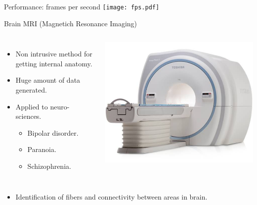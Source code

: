 \begin{frame}{Performance: frames per second}
\texttt{[image: fps.pdf]}
\end{frame}

\begin{frame}[t]{Brain MRI (Magnetich Resonance Imaging)}
\begin{columns}
\begin{itemize}
  \item Non intrusive method for getting internal anatomy.
  \item Huge amount of data generated.
  \item Applied to neuro-sciences.
    \begin{itemize}
      \item Bipolar disorder.
      \item Paranoia.
      \item Schizophrenia.
    \end{itemize}
\end{itemize}

\includegraphics[width=\textwidth]{img/mri-scanner.jpg}
\end{columns}

\vspace{2em}
\begin{itemize}
  \item Identification of fibers and connectivity between areas in brain.
\end{itemize}

\end{frame}

